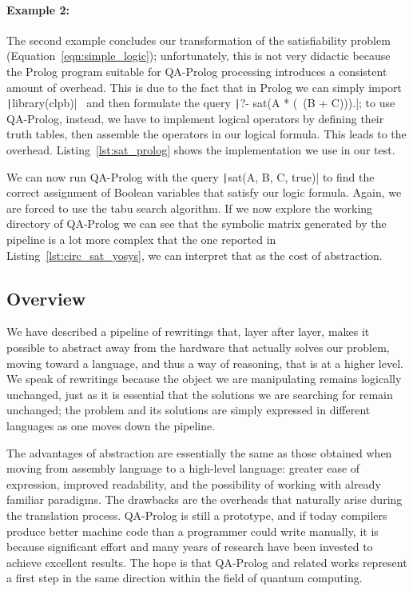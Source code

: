 {\paragraph{Example 2: }\label{ex:sat_prolog} The second example concludes our transformation of the satisfiability problem (Equation~\ref{eqn:simple_logic}); unfortunately, this is not very didactic because the Prolog program suitable for QA-Prolog processing introduces a consistent amount of overhead. This is due to the fact that in Prolog we can simply import \texttt|library(clpb)|~\cite{triska2018boolean} and then formulate the query \texttt|?- sat(A * (~(B + C))).|; to use QA-Prolog, instead, we have to implement logical operators by defining their truth tables, then assemble the operators in our logical formula. This leads to the overhead. Listing~\ref{lst:sat_prolog} shows the implementation we use in our test.
\begin{listing}[h]
	\caption{Satisfiability in Prolog}
	\label{lst:sat_prolog}
\end{listing}

We can now run QA-Prolog with the query \texttt|sat(A, B, C, true)| to find the correct assignment of Boolean variables that satisfy our logic formula. Again, we are forced to use the tabu search algorithm. If we now explore the working directory of QA-Prolog we can see that the symbolic matrix generated by the pipeline is a lot more complex that the one reported in Listing~\ref{lst:circ_sat_yosys}, we can interpret that as the cost of abstraction.

\subsection{Overview}
We have described a pipeline of rewritings that, layer after layer, makes it possible to abstract away from the hardware that actually solves our problem, moving toward a language, and thus a way of reasoning, that is at a higher level. We speak of rewritings because the object we are manipulating remains logically unchanged, just as it is essential that the solutions we are searching for remain unchanged; the problem and its solutions are simply expressed in different languages as one moves down the pipeline.

The advantages of abstraction are essentially the same as those obtained when moving from assembly language to a high-level language: greater ease of expression, improved readability, and the possibility of working with already familiar paradigms. The drawbacks are the overheads that naturally arise during the translation process. QA-Prolog is still a prototype, and if today compilers produce better machine code than a programmer could write manually, it is because significant effort and many years of research have been invested to achieve excellent results. The hope is that QA-Prolog and related works represent a first step in the same direction within the field of quantum computing.

}
